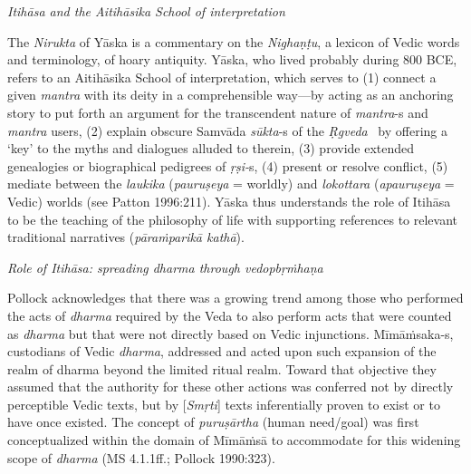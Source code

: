 \textit{Itihāsa and the Aitihāsika School of interpretation}

The \textit{Nirukta} of Yāska is a commentary on the \textit{Nighaṇṭu}, a lexicon of Vedic words and terminology, of hoary antiquity. Yāska, who lived probably during 800 BCE, refers to an Aitihāsika School of interpretation, which serves to (1) connect a given \textit{mantra} with its deity in a comprehensible way—by acting as an anchoring story to put forth an argument for the transcendent nature of \textit{mantra}-s and \textit{mantra} users, (2) explain obscure Samvāda \textit{sūkta}-s of the \textit{Ṛgveda}  by offering a ‘key’ to the myths and dialogues alluded to therein, (3) provide extended genealogies or biographical pedigrees of \textit{ṛṣi-}s, (4) present or resolve conflict, (5) mediate between the \textit{laukika} (\textit{pauruṣeya} = worldly) and \textit{lokottara} (\textit{apauruṣeya} = Vedic) worlds (see Patton 1996:211). Yāska thus understands the role of Itihāsa to be the teaching of the philosophy of life with supporting references to relevant traditional narratives (\textit{pāraṁparikā kathā}).

\textit{Role of Itihāsa: spreading dharma through vedopbṛṁhaṇa}

Pollock acknowledges that there was a growing trend among those who performed the acts of \textit{dharma} required by the Veda to also perform acts that were counted as \textit{dharma} but that were not directly based on Vedic injunctions. Mīmāṁsaka-s, custodians of Vedic \textit{dharma}, addressed and acted upon such expansion of the realm of dharma beyond the limited ritual realm. Toward that objective they assumed that the authority for these other actions was conferred not by directly perceptible Vedic texts, but by [\textit{Smṛti}] texts inferentially proven to exist or to have once existed. The concept of \textit{puruṣārtha} (human need/goal) was first conceptualized within the domain of Mīmāṁsā to accommodate for this widening scope of \textit{dharma} (MS 4.1.1ff.; Pollock 1990:323).

